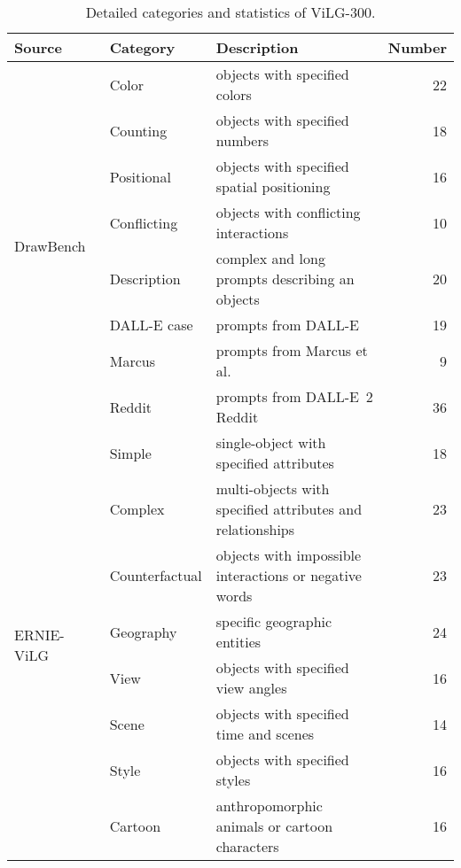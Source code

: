 \documentclass[10pt,twocolumn,letterpaper]{article}
\begin{document}
\begin{table*}[t]
  \centering\small
  \caption{Detailed categories and statistics of ViLG-300.}
    \begin{tabular}{lllr}
    \toprule
    Source & Category & Description & Number \\
    \midrule
    \multirow{8}{*}{DrawBench~\cite{DBLP:journals/corr/abs-2205-11487}} 
    & Color & objects with specified colors  & 22 \\ 
    & Counting & objects with specified numbers & 18 \\ 
    & Positional & objects with specified spatial positioning & 16 \\
    & Conflicting & objects with conflicting interactions & 10 \\
    & Description & complex and long prompts describing an objects & 20 \\
    & DALL-E case & prompts from DALL-E~\cite{DBLP:conf/icml/RameshPGGVRCS21} & 19 \\
    & Marcus & prompts from Marcus et al.~\cite{DBLP:journals/corr/abs-2204-13807} & 9 \\
    & Reddit & prompts from DALL-E~2 Reddit & 36 \\
    \midrule
    \multirow{8}{*}{ERNIE-ViLG~\cite{DBLP:journals/corr/abs-2112-15283}} 
    & Simple & single-object with specified attributes & 18 \\
    & Complex & multi-objects with specified attributes and relationships & 23 \\
    & Counterfactual & objects with impossible interactions or negative words & 23 \\
    & Geography & specific geographic entities & 24 \\
    & View & objects with specified view angles & 16 \\
    & Scene & objects with specified time and scenes & 14 \\
    & Style & objects with specified styles & 16 \\
    & Cartoon & anthropomorphic animals or cartoon characters & 16 \\
    \bottomrule
    \end{tabular}\label{tab:vilg300}\end{table*}
\end{document}
